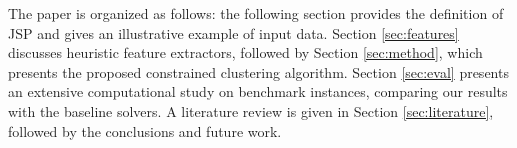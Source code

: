 \documentclass[runningheads]{llncs}
\begin{document}




The paper is organized as follows: the following section provides the definition of JSP and gives an illustrative example of input data. Section \ref{sec:features} discusses heuristic feature extractors, followed by Section \ref{sec:method}, which presents the proposed constrained clustering algorithm. Section \ref{sec:eval} presents an extensive computational study on benchmark instances, comparing our results with the baseline solvers. A literature review is given in Section \ref{sec:literature}, followed by the conclusions and future work.
\end{document}
